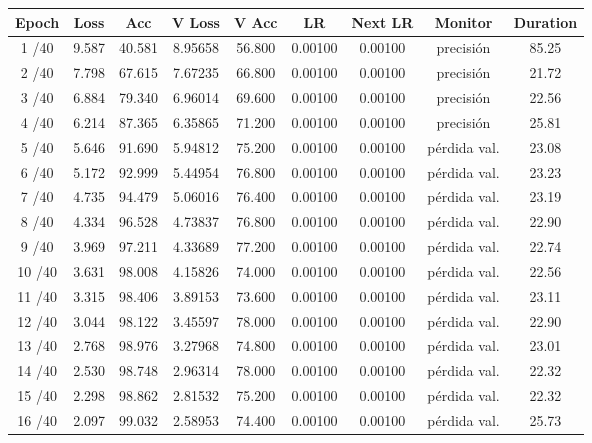     \begin{table}[ht]
        \small
        \centering
        \begin{tabular}{|c|c|c|c|c|c|c|c|c|}
        \hline
        \textbf{Epoch} & \textbf{Loss} & \textbf{Acc} & \textbf{V Loss} & \textbf{V Acc} & \textbf{LR} & \textbf{Next LR} & \textbf{Monitor} & \textbf{Duration} \\ \hline
        1 /40  & 9.587  & 40.581 & 8.95658 & 56.800 & 0.00100 & 0.00100 & precisión & 85.25  \\ \hline
        2 /40  & 7.798  & 67.615 & 7.67235 & 66.800 & 0.00100 & 0.00100 & precisión & 21.72  \\ \hline
        3 /40  & 6.884  & 79.340 & 6.96014 & 69.600 & 0.00100 & 0.00100 & precisión & 22.56  \\ \hline
        4 /40  & 6.214  & 87.365 & 6.35865 & 71.200 & 0.00100 & 0.00100 & precisión & 25.81  \\ \hline
        5 /40  & 5.646  & 91.690 & 5.94812 & 75.200 & 0.00100 & 0.00100 & pérdida val. & 23.08  \\ \hline
        6 /40  & 5.172  & 92.999 & 5.44954 & 76.800 & 0.00100 & 0.00100 & pérdida val. & 23.23  \\ \hline
        7 /40  & 4.735  & 94.479 & 5.06016 & 76.400 & 0.00100 & 0.00100 & pérdida val. & 23.19  \\ \hline
        8 /40  & 4.334  & 96.528 & 4.73837 & 76.800 & 0.00100 & 0.00100 & pérdida val. & 22.90  \\ \hline
        9 /40  & 3.969  & 97.211 & 4.33689 & 77.200 & 0.00100 & 0.00100 & pérdida val. & 22.74  \\ \hline
        10 /40 & 3.631  & 98.008 & 4.15826 & 74.000 & 0.00100 & 0.00100 & pérdida val. & 22.56  \\ \hline
        11 /40 & 3.315  & 98.406 & 3.89153 & 73.600 & 0.00100 & 0.00100 & pérdida val. & 23.11  \\ \hline
        12 /40 & 3.044  & 98.122 & 3.45597 & 78.000 & 0.00100 & 0.00100 & pérdida val. & 22.90  \\ \hline
        13 /40 & 2.768  & 98.976 & 3.27968 & 74.800 & 0.00100 & 0.00100 & pérdida val. & 23.01  \\ \hline
        14 /40 & 2.530  & 98.748 & 2.96314 & 78.000 & 0.00100 & 0.00100 & pérdida val. & 22.32  \\ \hline
        15 /40 & 2.298  & 98.862 & 2.81532 & 75.200 & 0.00100 & 0.00100 & pérdida val. & 22.32  \\ \hline
        16 /40 & 2.097  & 99.032 & 2.58953 & 74.400 & 0.00100 & 0.00100 & pérdida val. & 25.73  \\ \hline

\end{tabular}
\end{table}
